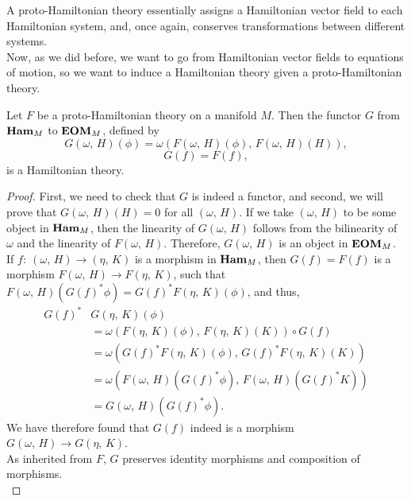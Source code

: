 \documentclass{article}
\newcommand{\category}[1]{{\normalfont\textbf{#1}}}
\begin{document}
\begin{multicols}{2}
\begin{definition}
	\end{definition}
	A proto-Hamiltonian theory essentially assigns a Hamiltonian vector field to each Hamiltonian system, and, once again, conserves transformations between different systems.\\
	Now, as we did before, we want to go from Hamiltonian vector fields to equations of motion, so we want to induce a Hamiltonian theory given a proto-Hamiltonian theory.
	\begin{lemma}\label{lm:hamiltoniantheory}
		Let \(F\) be a proto-Hamiltonian theory on a manifold \(M\). Then the functor \(G\) from \(\category{Ham}_M\) to \(\category{EOM}_M\), defined by
		\begin{equation}
			G(\omega,\, H)(\phi) = \omega(F(\omega,\, H)(\phi),\, F(\omega,\, H)(H)),
		\end{equation}
		\begin{equation}
			G(f) = F(f),
		\end{equation}
		is a Hamiltonian theory.
	\end{lemma}
	\begin{proof}
		First, we need to check that \(G\) is indeed a functor, and second, we will prove that \(G(\omega,\,H)(H)=0\) for all \((\omega,\,H)\).
		If we take \((\omega,\,H)\) to be some object in \(\category{Ham}_M\), then the linearity of \(G(\omega,\,H)\) follows from the bilinearity of \(\omega\) and the linearity of \(F(\omega,\,H)\). Therefore, \(G(\omega,\,H)\) is an object in \(\category{EOM}_M\).\\
		If \(f:\ (\omega,\,H)\to(\eta,\,K)\) is a morphism in \(\category{Ham}_M\), then \(G(f) = F(f)\) is a morphism \(F(\omega,\,H)\to F(\eta,\,K)\), such that \(F(\omega,\,H)(G(f)^*\phi) = G(f)^*F(\eta,\,K)(\phi)\), and thus,
		\begin{align*}
			G(f)^*&G(\eta,\,K)(\phi) \\
			&= \omega(F(\eta,\,K)(\phi),\,F(\eta,\,K)(K))\circ G(f)\\
			&= \omega(G(f)^*F(\eta,\,K)(\phi),\,G(f)^*F(\eta,\,K)(K))\\
			&= \omega(F(\omega,\,H)(G(f)^*\phi),\,F(\omega,\,H)(G(f)^*K))\\
			&= G(\omega,\,H)(G(f)^*\phi).
		\end{align*}
		We have therefore found that \(G(f)\) indeed is a morphism \(G(\omega,\,H)\to G(\eta,\,K)\).\\
		As inherited from \(F\), \(G\) preserves identity morphisms and composition of morphisms.\\

\end{proof}
\end{multicols}
\end{document}
